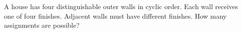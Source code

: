 A house has four distinguishable outer walls in cyclic order. Each wall receives one of four finishes. Adjacent walls must have different finishes. How many assignments are possible?
